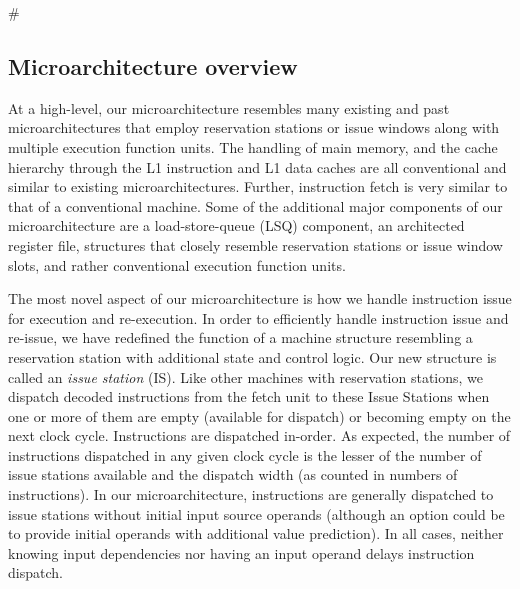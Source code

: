 #\documentclass[10pt,dvips]{article}
\begin{document}
\subsection{Microarchitecture overview}
%
At a high-level, our microarchitecture resembles many existing
and past microarchitectures that employ reservation stations
or issue windows along with multiple execution function units.
The handling of main memory, and the cache hierarchy 
through the L1 instruction and L1 data caches are all
conventional and similar to existing microarchitectures.
Further, instruction fetch is very similar to that of a conventional
machine.
Some of the additional major components of our
microarchitecture are a
load-store-queue (LSQ) component, an architected register file,
structures that closely resemble reservation stations or issue
window slots, and rather conventional execution function units.

The most novel aspect of our microarchitecture is how we
handle instruction issue for execution and re-execution.
In order to efficiently handle instruction issue and re-issue,
we have redefined the function of a machine structure
resembling a reservation station with additional state and control
logic.  
Our new structure is called 
an \textit{issue station} (IS).
Like other machines with reservation stations, we dispatch 
decoded instructions from the fetch unit to these Issue Stations
when one or more of them are empty (available for dispatch) or 
becoming empty on the next clock cycle.  
Instructions are dispatched in-order.
As expected, the number of instructions dispatched in any 
given clock cycle is
the lesser of the number of issue stations available and the
dispatch width (as counted in numbers of instructions).
In our microarchitecture, instructions are generally
dispatched to issue stations without
initial input source operands (although an option could be
to provide initial operands with additional value prediction).
In all cases, neither knowing input dependencies nor having
an input operand delays instruction dispatch.
\end{document}
